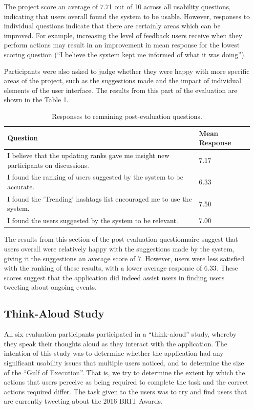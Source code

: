 \documentclass{l4proj}
\begin{document}
The project score an average of 7.71 out of 10 across all usability questions, indicating that users overall found the system to be usable. However, responses to individual questions indicate that there are certainly areas which can be improved. For example, increasing the level of feedback users receive when they perform actions may result in an improvement in mean response for the lowest scoring question (``I believe the system kept me informed of what it was doing'').

Participants were also asked to judge whether they were happy with more specific areas of the project, such as the suggestions made and the impact of individual elements of the user interface. The results from this part of the evaluation are shown in the Table \ref{table:posteval2}.

\begin{table}[H]
    \centering
    \begin{tabular}{| l | l |}
    \hline
    Question & Mean Response \\ \hline
    I believe that the updating ranks gave me insight new participants on discussions. & 7.17 \\ \hline
    I found the ranking of users suggested by the system to be accurate. & 6.33  \\ \hline
    I found the 'Trending' hashtags list encouraged me to use the system. & 7.50 \\ \hline
    I found the users suggested by the system to be relevant. & 7.00 \\
    \hline
    \end{tabular}
    \caption{\label{table:posteval2} Responses to remaining post-evaluation questions.}
\end{table}

The results from this section of the post-evaluation questionnaire suggest that users overall were relatively happy with the suggestions made by the system, giving it the suggestions an average score of 7. However, users were less satisfied with the ranking of these results, with a lower average response of 6.33. These scores suggest that the application did indeed assist users in finding users tweeting about ongoing events.
 
    \subsection{Think-Aloud Study}
    All six evaluation participants participated in a ``think-aloud'' study, whereby they speak their thoughts aloud as they interact with the application. The intention of this study was to determine whether the application had any significant usability issues that multiple users noticed, and to determine the size of the ``Gulf of Execution''. That is, we try to determine the extent by which the actions that users perceive as being required to complete the task and the correct actions required differ. The task given to the users was to try and find users that are currently tweeting about the 2016 BRIT Awards.
    
\end{document}
